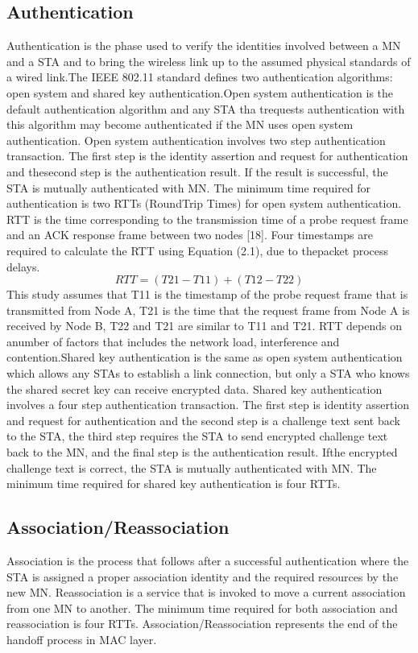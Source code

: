 \documentclass[12pt,a4paper]{report}
\begin{document}
\subsection{Authentication}
Authentication is the phase used to verify the identities involved between a MN and a STA and to bring the wireless link up to the assumed physical standards of a wired link.The IEEE 802.11 standard defines two authentication algorithms: open system and shared key authentication.Open system authentication is the default authentication algorithm and any STA tha trequests authentication with this algorithm may become authenticated if the MN uses open system authentication. Open system authentication involves two step authentication transaction. The first step is the identity assertion and request for authentication and thesecond step is the authentication result. If the result is successful, the STA is mutually authenticated with MN. The minimum time required for authentication is two RTTs (RoundTrip Times) for open system authentication. RTT is the time corresponding to the transmission time of a probe request frame and an ACK response frame between two nodes [18]. Four timestamps are required to calculate the RTT using Equation (2.1), due to thepacket process delays. 
$$RTT = (T21-T11) + (T12-T22)$$
This study assumes that T11 is the timestamp of the probe request frame that is transmitted from Node A, T21 is the time that the request frame from Node A is received by Node B, T22 and T21 are similar to T11 and T21. RTT depends on anumber of factors that includes the network load, interference and contention.Shared key authentication is the same as open system authentication which allows any STAs to establish a link connection, but only a STA who knows the shared secret key can receive encrypted data. Shared key authentication involves a four step authentication transaction. The first step is identity assertion and request for authentication and the second step is a challenge text sent back to the STA, the third step requires the STA to send encrypted challenge text back to the MN, and the final step is the authentication result. Ifthe encrypted challenge text is correct, the STA is mutually authenticated with MN. The minimum time required for shared key authentication is four RTTs.
\subsection{ Association/Reassociation}
Association is the process that follows after a successful authentication where the STA is assigned a proper association identity and the required resources by the new MN. Reassociation is a service that is invoked to move a current association from one MN to another. The minimum time required for both association and reassociation is four RTTs. Association/Reassociation represents the end of the handoff process in MAC layer.
\end{document}
